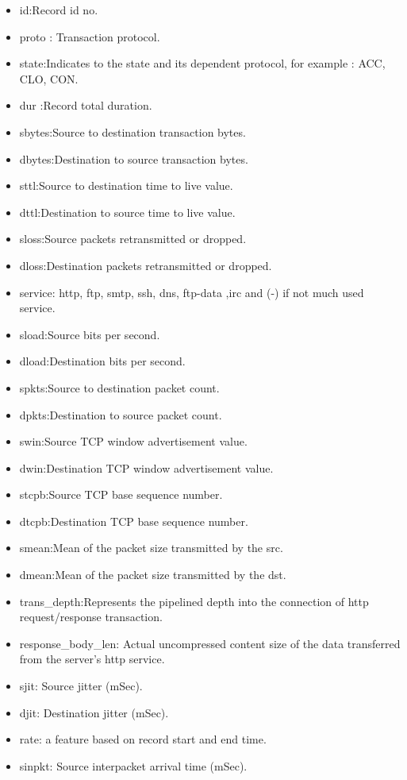 \documentclass[14pt, conference]{IEEEtran}
\begin{document}
\begin{itemize}
\item  id:Record id no.
\item proto : Transaction protocol.
\item state:Indicates to the state and its dependent protocol, for example : ACC, CLO, CON.
\item dur :Record total duration.
\item sbytes:Source to destination transaction bytes.
\item dbytes:Destination to source transaction bytes.
\item sttl:Source to destination time to live value.
\item dttl:Destination to source time to live value.
\item sloss:Source packets retransmitted or dropped.
\item dloss:Destination packets retransmitted or dropped.
\item service: http, ftp, smtp, ssh, dns, ftp-data ,irc  and (-) if not much used service.
\item sload:Source bits per second.
\item dload:Destination bits per second.
\item spkts:Source to destination packet count.
\item dpkts:Destination to source packet count.
\item swin:Source TCP window advertisement value.
\item dwin:Destination TCP window advertisement value.
\item stcpb:Source TCP base sequence number.
\item dtcpb:Destination TCP base sequence number.
\item smean:Mean of the packet size transmitted by the src.\item dmean:Mean of the packet size transmitted by the dst.
\item trans\_depth:Represents the pipelined depth into the connection of http request/response transaction.
\item response\_body\_len: Actual uncompressed content size of the data transferred from the server’s http service.
\item sjit: Source jitter (mSec).
\item djit: Destination jitter (mSec).
\item rate: a feature based on record start and end time.
\item sinpkt: Source interpacket arrival time (mSec).

\end{itemize}
\end{document}
